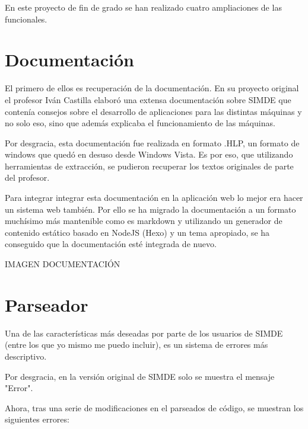 

En este proyecto de fin de grado se han realizado cuatro ampliaciones de las funcionales. 

\section{Documentación}
\label{6:sec1}

El primero de ellos es recuperación de la documentación. En su proyecto original el profesor Iván Castilla elaboró una extensa documentación sobre SIMDE que contenía consejos sobre el desarrollo de aplicaciones para las distintas máquinas y no solo eso, sino que además explicaba el funcionamiento de las máquinas.

Por desgracia, esta documentación fue realizada en formato .HLP, un formato de windows que quedó en desuso desde Windows Vista. Es por eso, que utilizando herramientas de extracción, se pudieron recuperar los textos originales de parte del profesor.

Para integrar integrar esta documentación en la aplicación web lo mejor era hacer un sistema web también. Por ello se ha migrado la documentación a un formato muchísimo más mantenible como es markdown y utilizando un generador de contenido estático basado en NodeJS (Hexo) y un tema apropiado, se ha conseguido que la documentación esté integrada de nuevo.

    IMAGEN DOCUMENTACIÓN

\section{Parseador}
\label{6:sec2}

Una de las características más deseadas por parte de los usuarios de SIMDE (entre los que yo mismo me puedo incluir), es un sistema de errores más descriptivo. 

Por desgracia, en la versión original de SIMDE solo se muestra el mensaje "Error".

Ahora, tras una serie de modificaciones en el parseados de código, se muestran los siguientes errores:

